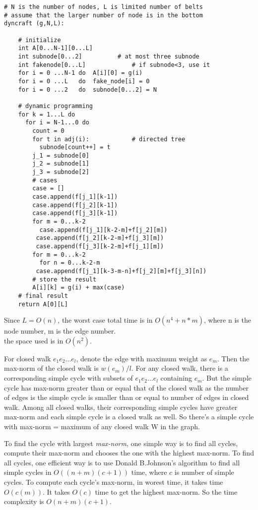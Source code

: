 \documentclass[12pt,a4paper]{article}
\newcommand{\question}[1]{\bigskip\noindent{\textbf{Q{#1} solution}}}
\begin{document}
\begin{lstlisting}
# N is the number of nodes, L is limited number of belts
# assume that the larger number of node is in the bottom
dyncraft (g,N,L):  

	# initialize
	int A[0...N-1][0...L]
	int subnode[0...2]  		# at most three subnode
	int fakenode[0...L] 			# if subnode<3, use it
	for i = 0 ...N-1 do  A[i][0] = g(i)
	for i = 0 ...L 	 do  fake_node[i] = 0
	for i = 0 ...2 	 do  subnode[0...2] = N
	
	# dynamic programming
	for k = 1...L do
	  for i = N-1...0 do
	    count = 0
	    for t in adj(i):  			# directed tree
	      subnode[count++] = t
	    j_1 = subnode[0]
	    j_2 = subnode[1]
	    j_3 = subnode[2]
	    # cases
	    case = []
	    case.append(f[j_1][k-1])
	    case.append(f[j_2][k-1])
	    case.append(f[j_3][k-1])
	    for m = 0...k-2
	      case.append(f[j_1][k-2-m]+f[j_2][m]) 
		 case.append(f[j_2][k-2-m]+f[j_3][m])
		 case.append(f[j_3][k-2-m]+f[j_1][m])
	    for m = 0...k-2
	      for n = 0...k-2-m
		 case.append(f[j_1][k-3-m-n]+f[j_2][m]+f[j_3][n])
	    # store the result
	    A[i][k] = g(i) + max(case)
	# final result
	return A[0][L]

\end{lstlisting}
Since $L = O(n)$, the worst case total time is in $O(n^4 + n*m)$, where n is the node number, m is the edge number.\\
the space used is in $O(n^2)$.\\


\question{27.A}

For closed walk $e_1e_2\dots e_l$, denote the edge with maximum weight as $e_m$. Then the max-norm of the closed walk is $w(e_m)/l$. For any closed walk, there is a corresponding simple cycle with subsets of $e_1e_2\dots e_l$ containing $e_m$. But the simple cycle has max-norm greater than or equal that of the closed walk as the number of edges is the simple cycle is smaller than or equal to number of edges in closed walk. Among all closed walks, their corresponding simple cycles have greater max-norm and each simple cycle is a closed walk as well. So there's a simple cycle with max-norm = maximum of any closed walk W in the graph.

\question{27.B}

To find the cycle with largest {\em max-norm}, one simple way is to find all cycles, compute their max-norm and chooses the one with the highest max-norm. To find all cycles, one efficient way is to use Donald B.Johnson's algorithm to find all simple cycles in $O((n + m)(c + 1))$ time, where $c$ is number of simple cycles\cite{doi:10.1137/0204007}. To compute each cycle's max-norm, in worest time, it takes time $O(c(m))$. It takes $O(c)$ time to get the highest max-norm. So the time complexity is $O(n + m)(c + 1)$.



\end{document}
